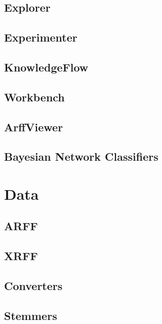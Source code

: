 \documentclass[a4paper]{book}
\begin{document}
\chapter{Explorer}


\chapter{Experimenter}


\chapter{KnowledgeFlow}


\chapter{Workbench}


\chapter{ArffViewer}


\chapter{Bayesian Network Classifiers}


\part{Data}

\chapter{ARFF}


\chapter{XRFF}
\label{xrff}


\chapter{Converters}


\chapter{Stemmers}

\end{document}
